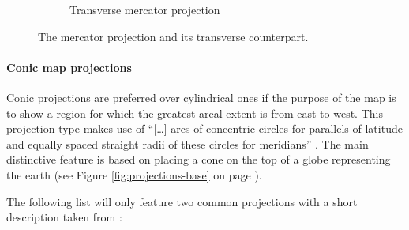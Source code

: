 \begin{figure}[!htb]
\begin{subfigure}[b]{0.4\textwidth}
    \caption[
        Transverse mercator projection, Urldate: 07.2016 \newline
        \small\texttt{\url{https://upload.wikimedia.org/wikipedia/commons/1/15/MercTranSph.png}}.
    ]{Transverse mercator projection}
    \label{fig:projections-mercator-transverse}
  \end{subfigure}
  \caption[
    Mercator projection, Urldate: 07.2016 \newline
    \small\texttt{\url{https://upload.wikimedia.org/wikipedia/commons/f/f0/MercNormSph.png}}.
    Transverse mercator projection, Urldate: 07.2016 \newline
    \small\texttt{\url{https://upload.wikimedia.org/wikipedia/commons/1/15/MercTranSph.png}}.
  ]{
    The mercator projection and its transverse counterpart.
  }
\end{figure}

\paragraph{Conic map projections}
Conic projections are preferred over cylindrical ones if the purpose of the map is to show a region for which the greatest areal extent is from east to west. This projection type makes use of ``[\ldots] arcs of concentric circles for parallels of latitude and equally spaced straight radii of these circles for meridians'' . The main distinctive feature is based on placing a cone on the top of a globe representing the earth (see Figure \ref{fig:projections-base} on page \pageref{fig:projections-base}).

The following list will only feature two common projections with a short description taken from \citeauthor{Snyder1987} :

